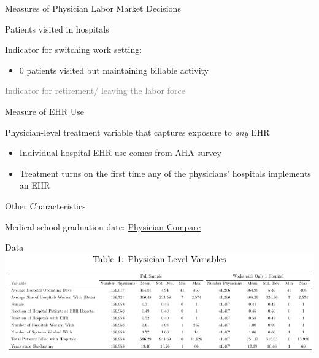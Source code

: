 \documentclass[10pt]{beamer}
\begin{document}
\begin{frame}{Measures of Physician Labor Market Decisions}


     Patients visited in hospitals
     
     \vspace{4mm}
     
     Indicator for switching work setting:
    \begin{itemize}
        \item 0 patients visited but maintaining billable activity
    \end{itemize}
    
    \vspace{4mm}
    
    \textcolor{gray}
     {Indicator for retirement/ leaving the labor force}

\end{frame}

\begin{frame}{Measure of EHR Use}

Physician-level treatment variable that captures exposure to \textit{any} EHR
\vspace{3mm}
\begin{itemize}
    \item Individual hospital EHR use comes from AHA survey
    \vspace{3mm}
    \item Treatment turns on the first time any of the physicians' hospitals implements an EHR
\end{itemize}
\end{frame}


\begin{frame}{Other Characteristics}

Medical school graduation date: \underline{Physician Compare}

\end{frame}

\begin{frame}{Data}
\centering
    \includegraphics[scale=.8]{Objects/sumstats.pdf}
    
\end{frame}
\end{document}
